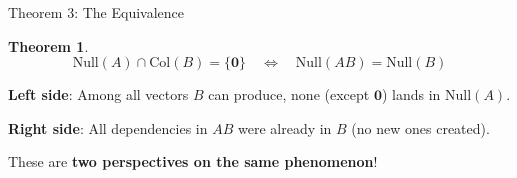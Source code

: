 \documentclass[10pt]{beamer}
\theoremstyle{definition}
\newtheorem{thm}{Theorem}[section]
\newcommand{\x}[1]{\alert{\textbf{#1}}}
\begin{document}
\begin{frame}{Theorem 3: The Equivalence}

\begin{thm}
$$\text{Null}(A) \cap \text{Col}(B) = \{\mathbf{0}\} \quad \Longleftrightarrow \quad \text{Null}(AB) = \text{Null}(B)$$
\end{thm}

\vspace{1em}

\x{Left side}: Among all vectors $B$ can produce, none (except $\mathbf{0}$) lands in $\text{Null}(A)$.

\vspace{1em}

\x{Right side}: All dependencies in $AB$ were already in $B$ (no new ones created).

\vspace{1em}

These are \x{two perspectives on the same phenomenon}!

\end{frame}
\end{document}
